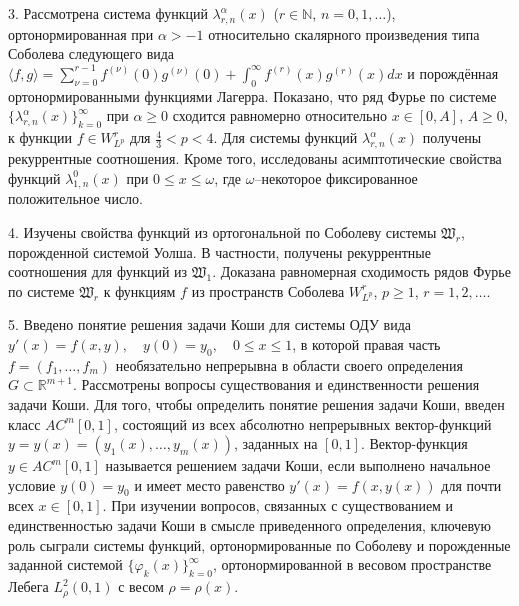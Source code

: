 3. Рассмотрена система функций $\lambda_{r,n}^{\alpha}(x)$ ($r\in\mathbb{N}$, $n=0, 1, \ldots$), ортонормированная при $\alpha>-1$ относительно скалярного произведения типа Соболева следующего вида $\langle f,g\rangle=\sum_{\nu=0}^{r-1}f^{(\nu)}(0)g^{(\nu)}(0)+\int_{0}^{\infty} f^{(r)}(x)g^{(r)}(x) dx$ и порождённая ортонормированными функциями Лагерра.
Показано, что ряд Фурье по системе $\{\lambda_{r,n}^{\alpha}(x)\}_{k=0}^\infty$ при $\alpha\geq0$ сходится равномерно относительно $x\in[0, A]$, $A\geq0,$ к функции $f\in W^r_{L^p}$ для $\frac{4}{3}<p<4$.
Для системы функций $\lambda_{r,n}^{\alpha}(x)$ получены рекуррентные соотношения.
Кроме того, исследованы асимптотические свойства функций $\lambda_{1,n}^0(x)$ при $0\leq x\leq\omega$, где $\omega$--некоторое фиксированное положительное число.

4. Изучены свойства функций из ортогональной по Соболеву системы $\mathfrak{W}_r$, порожденной системой Уолша. 
В частности, получены рекуррентные соотношения для функций из $\mathfrak{W}_1$.
Доказана равномерная сходимость рядов Фурье по системе $\mathfrak{W}_r$ к функциям $f$ из пространств Соболева $W^r_{L^p}$, $p \ge 1$,  $r=1,2,\ldots$.

5. Введено понятие решения задачи Коши для системы ОДУ вида
$ y'(x)=f(x,y),\quad y(0)=y_0, \quad 0\le x\le 1$, в которой правая часть  $f=(f_1,\ldots,f_m)$ необязательно непрерывна в области своего определения $G\subset\mathbb{R}^{m+1}$. Рассмотрены вопросы существования и единственности решения задачи Коши. Для того, чтобы определить понятие  решения задачи Коши, введен класс  $AC^m[0,1]$, состоящий из всех абсолютно непрерывных вектор-функций $y=y(x)=(y_1(x),\ldots,y_m(x))$, заданных на $[0,1]$.
Вектор-функция $y\in AC^m[0,1]$ называется решением задачи Коши, если выполнено начальное условие $y(0)=y_0$ и имеет место равенство $y'(x)=f(x,y(x))$ для почти всех $x\in[0,1]$.
При изучении вопросов, связанных с существованием и единственностью задачи Коши в смысле приведенного определения, ключевую роль сыграли системы функций, ортонормированные по Соболеву и порожденные заданной системой  $\{\varphi_k(x)\}_{k=0}^\infty$, ортонормированной в весовом пространстве Лебега $L_\rho^2(0,1)$  с весом $\rho=\rho(x)$. 